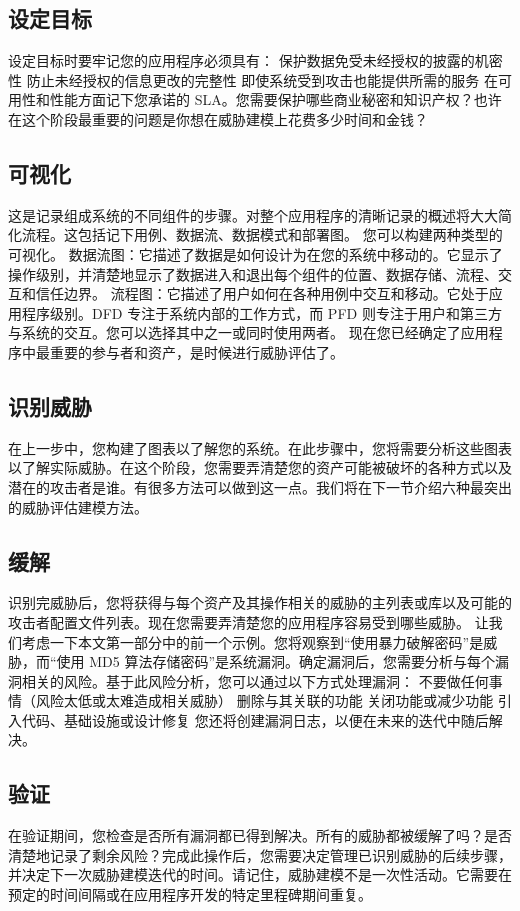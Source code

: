 \subsection[]{设定目标}
设定目标时要牢记您的应用程序必须具有：
保护数据免受未经授权的披露的机密性
防止未经授权的信息更改的完整性
即使系统受到攻击也能提供所需的服务
在可用性和性能方面记下您承诺的 SLA。您需要保护哪些商业秘密和知识产权？也许在这个阶段最重要的问题是你想在威胁建模上花费多少时间和金钱？
\subsection[]{可视化}
这是记录组成系统的不同组件的步骤。对整个应用程序的清晰记录的概述将大大简化流程。这包括记下用例、数据流、数据模式和部署图。  您可以构建两种类型的可视化。
数据流图：它描述了数据是如何设计为在您的系统中移动的。它显示了操作级别，并清楚地显示了数据进入和退出每个组件的位置、数据存储、流程、交互和信任边界。 
流程图：它描述了用户如何在各种用例中交互和移动。它处于应用程序级别。DFD 专注于系统内部的工作方式，而 PFD 则专注于用户和第三方与系统的交互。您可以选择其中之一或同时使用两者。
现在您已经确定了应用程序中最重要的参与者和资产，是时候进行威胁评估了。
\subsection[]{识别威胁}
在上一步中，您构建了图表以了解您的系统。在此步骤中，您将需要分析这些图表以了解实际威胁。在这个阶段，您需要弄清楚您的资产可能被破坏的各种方式以及潜在的攻击者是谁。有很多方法可以做到这一点。我们将在下一节介绍六种最突出的威胁评估建模方法。 
\subsection[]{缓解}
识别完威胁后，您将获得与每个资产及其操作相关的威胁的主列表或库以及可能的攻击者配置文件列表。现在您需要弄清楚您的应用程序容易受到哪些威胁。  让我们考虑一下本文第一部分中的前一个示例。您将观察到“使用暴力破解密码”是威胁，而“使用 MD5 算法存储密码”是系统漏洞。确定漏洞后，您需要分析与每个漏洞相关的风险。基于此风险分析，您可以通过以下方式处理漏洞： 
\newline
不要做任何事情（风险太低或太难造成相关威胁）
删除与其关联的功能
关闭功能或减少功能
引入代码、基础设施或设计修复
\newline
您还将创建漏洞日志，以便在未来的迭代中随后解决。
\subsection[]{验证}
在验证期间，您检查是否所有漏洞都已得到解决。所有的威胁都被缓解了吗？是否清楚地记录了剩余风险？完成此操作后，您需要决定管理已识别威胁的后续步骤，并决定下一次威胁建模迭代的时间。请记住，威胁建模不是一次性活动。它需要在预定的时间间隔或在应用程序开发的特定里程碑期间重复。
